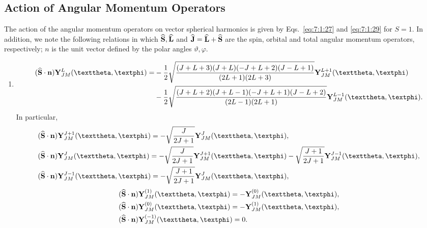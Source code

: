 \subsection{Action of Angular Momentum Operators}\label{sec:7.3.7}
The action of the angular momentum operators on vector spherical harmonics is given by Eqs.~\eqref{eq:7:1:27} and \eqref{eq:7:1:29} for $S=1$. In addition, we note the following relations in which $\widehat{\mathbf{S}}, \widehat{\mathbf{L}}$ and $\widehat{\mathbf{J}}=\widehat{\mathbf{L}}+\widehat{\mathbf{S}}$ are the spin, orbital and total angular momentum operators, respectively; $n$ is the unit vector defined by the polar angles $\vartheta, \varphi$.\\
\begin{enumerate}[label=(\alph*)]
\item
\begin{align}
(\widehat{\vect{S}} \cdot \vect{n}) \vect{Y}_{J M}^{L}(\vartheta, \varphi)=&-\frac{1}{2} \sqrt{\frac{(J+L+3)(J+L)(-J+L+2)(J-L+1)}{(2 L+1)(2 L+3)}} \vect{Y}_{J M}^{L+1}(\vartheta, \varphi)\notag\\
&-\frac{1}{2} \sqrt{\frac{(J+L+2)(J+L-1)(-J+L+1)(J-L+2)}{(2 L-1)(2 L+1)}} \vect{Y}_{J M}^{L-1}(\vartheta, \varphi). \label{eq:7:3:61}
\end{align}
In particular,
\begin{align}
&(\widehat{\vect{S}} \cdot \vect{n}) \vect{Y}_{J M}^{J+1}(\vartheta, \varphi)=-\sqrt{\frac{J}{2 J+1}} \vect{Y}_{J M}^{J}(\vartheta, \varphi), \notag\\
&(\widehat{\vect{S}} \cdot \vect{n}) \vect{Y}_{J M}^{J}(\vartheta, \varphi)=-\sqrt{\frac{J}{2 J+1}} \vect{Y}_{J M}^{J+1}(\vartheta, \varphi)-\sqrt{\frac{J+1}{2 J+1}} \vect{Y}_{J M}^{J-1}(\vartheta, \varphi), \label{eq:7:3:62}\\
&(\widehat{\vect{S}} \cdot \vect{n}) \vect{Y}_{J M}^{J-1}(\vartheta, \varphi)=-\sqrt{\frac{J+1}{2 J+1}} \vect{Y}_{J M}^{J}(\vartheta, \varphi), \notag
\end{align}
\begin{align}
&(\widehat{\vect{S}} \cdot \vect{n}) \vect{Y}_{J M}^{(1)}(\vartheta, \varphi)=-\vect{Y}_{J M}^{(0)}(\vartheta, \varphi), \notag\\
&(\widehat{\vect{S}} \cdot \vect{n}) \vect{Y}_{J M}^{(0)}(\vartheta, \varphi)=-\vect{Y}_{J M}^{(1)}(\vartheta, \varphi), \label{eq:7:3:63}\\
&(\widehat{\vect{S}} \cdot \vect{n}) \vect{Y}_{J M}^{(-1)}(\vartheta, \varphi)=0. \notag

\end{align}
\end{enumerate}
